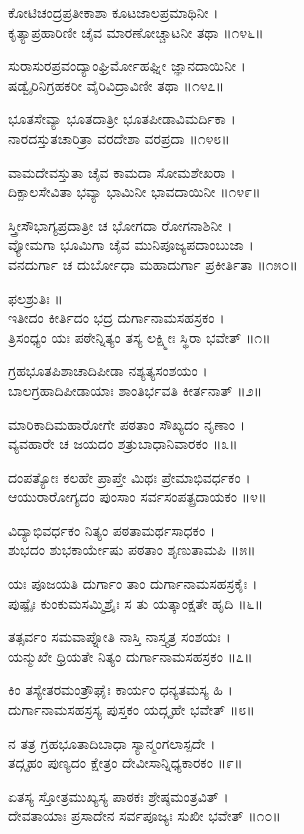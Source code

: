 ಕೋಟಿಚಂದ್ರಪ್ರತೀಕಾಶಾ ಕೂಟಜಾಲಪ್ರಮಾಥಿನೀ ।\\
ಕೃತ್ಯಾಪ್ರಹಾರಿಣೀ ಚೈವ ಮಾರಣೋಚ್ಚಾಟನೀ ತಥಾ ॥೧೪೬॥

ಸುರಾಸುರಪ್ರವಂದ್ಯಾಂಘ್ರಿರ್ಮೋಹಘ್ನೀ ಜ್ಞಾನದಾಯಿನೀ ।\\
ಷಡ್ವೈರಿನಿಗ್ರಹಕರೀ ವೈರಿವಿದ್ರಾವಿಣೀ ತಥಾ ॥೧೪೭॥

ಭೂತಸೇವ್ಯಾ ಭೂತದಾತ್ರೀ ಭೂತಪೀಡಾವಿಮರ್ದಿಕಾ ।\\
ನಾರದಸ್ತುತಚಾರಿತ್ರಾ ವರದೇಶಾ ವರಪ್ರದಾ ॥೧೪೮॥

ವಾಮದೇವಸ್ತುತಾ ಚೈವ ಕಾಮದಾ ಸೋಮಶೇಖರಾ ।\\
ದಿಕ್ಪಾಲಸೇವಿತಾ ಭವ್ಯಾ ಭಾಮಿನೀ ಭಾವದಾಯಿನೀ ॥೧೪೯॥

ಸ್ತ್ರೀಸೌಭಾಗ್ಯಪ್ರದಾತ್ರೀ ಚ ಭೋಗದಾ ರೋಗನಾಶಿನೀ ।\\
ವ್ಯೋಮಗಾ ಭೂಮಿಗಾ ಚೈವ ಮುನಿಪೂಜ್ಯಪದಾಂಬುಜಾ ।\\
ವನದುರ್ಗಾ ಚ ದುರ್ಬೋಧಾ ಮಹಾದುರ್ಗಾ ಪ್ರಕೀರ್ತಿತಾ ॥೧೫೦॥

ಫಲಶ್ರುತಿಃ ॥\\
ಇತೀದಂ ಕೀರ್ತಿದಂ ಭದ್ರ ದುರ್ಗಾನಾಮಸಹಸ್ರಕಂ ।\\
ತ್ರಿಸಂಧ್ಯಂ ಯಃ ಪಠೇನ್ನಿತ್ಯಂ ತಸ್ಯ ಲಕ್ಷ್ಮೀಃ ಸ್ಥಿರಾ ಭವೇತ್ ॥೧॥

ಗ್ರಹಭೂತಪಿಶಾಚಾದಿಪೀಡಾ ನಶ್ಯತ್ಯಸಂಶಯಂ ।\\
ಬಾಲಗ್ರಹಾದಿಪೀಡಾಯಾಃ ಶಾಂತಿರ್ಭವತಿ ಕೀರ್ತನಾತ್ ॥೨॥

ಮಾರಿಕಾದಿಮಹಾರೋಗೇ ಪಠತಾಂ ಸೌಖ್ಯದಂ ನೃಣಾಂ ।\\
ವ್ಯವಹಾರೇ ಚ ಜಯದಂ ಶತ್ರುಬಾಧಾನಿವಾರಕಂ ॥೩॥

ದಂಪತ್ಯೋಃ ಕಲಹೇ ಪ್ರಾಪ್ತೇ ಮಿಥಃ ಪ್ರೇಮಾಭಿವರ್ಧಕಂ ।\\
ಆಯುರಾರೋಗ್ಯದಂ ಪುಂಸಾಂ ಸರ್ವಸಂಪತ್ಪ್ರದಾಯಕಂ ॥೪॥

ವಿದ್ಯಾಭಿವರ್ಧಕಂ ನಿತ್ಯಂ ಪಠತಾಮರ್ಥಸಾಧಕಂ ।\\
ಶುಭದಂ ಶುಭಕಾರ್ಯೇಷು ಪಠತಾಂ ಶೃಣುತಾಮಪಿ ॥೫॥

ಯಃ ಪೂಜಯತಿ ದುರ್ಗಾಂ ತಾಂ ದುರ್ಗಾನಾಮಸಹಸ್ರಕೈಃ ।\\
ಪುಷ್ಪೈಃ ಕುಂಕುಮಸಮ್ಮಿಶ್ರೈಃ ಸ ತು ಯತ್ಕಾಂಕ್ಷತೇ ಹೃದಿ ॥೬॥

ತತ್ಸರ್ವಂ ಸಮವಾಪ್ನೋತಿ ನಾಸ್ತಿ ನಾಸ್ತ್ಯತ್ರ ಸಂಶಯಃ ।\\
ಯನ್ಮುಖೇ ಧ್ರಿಯತೇ ನಿತ್ಯಂ ದುರ್ಗಾನಾಮಸಹಸ್ರಕಂ ॥೭॥

ಕಿಂ ತಸ್ಯೇತರಮಂತ್ರೌಘೈಃ ಕಾರ್ಯಂ ಧನ್ಯತಮಸ್ಯ ಹಿ ।\\
ದುರ್ಗಾನಾಮಸಹಸ್ರಸ್ಯ ಪುಸ್ತಕಂ ಯದ್ಗೃಹೇ ಭವೇತ್ ॥೮॥

ನ ತತ್ರ ಗ್ರಹಭೂತಾದಿಬಾಧಾ ಸ್ಯಾನ್ಮಂಗಲಾಸ್ಪದೇ ।\\
ತದ್ಗೃಹಂ ಪುಣ್ಯದಂ ಕ್ಷೇತ್ರಂ ದೇವೀಸಾನ್ನಿಧ್ಯಕಾರಕಂ ॥೯॥

ಏತಸ್ಯ ಸ್ತೋತ್ರಮುಖ್ಯಸ್ಯ ಪಾಠಕಃ ಶ್ರೇಷ್ಠಮಂತ್ರವಿತ್ ।\\
ದೇವತಾಯಾಃ ಪ್ರಸಾದೇನ ಸರ್ವಪೂಜ್ಯಃ ಸುಖೀ ಭವೇತ್ ॥೧೦॥

